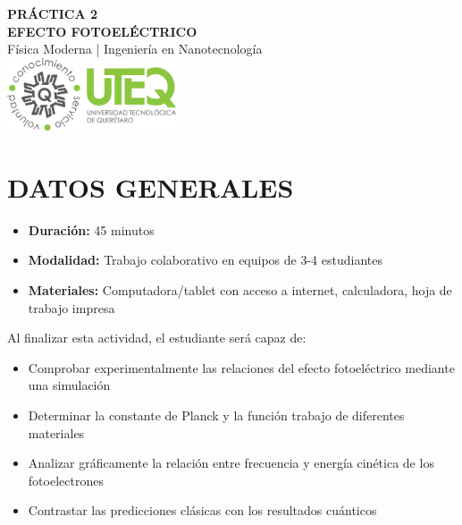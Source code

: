 \documentclass[12pt,a4paper]{article}
\begin{document}
	
	\begin{center}
		{\Huge \textbf{PRÁCTICA 2}}\\[0.3cm]
		{\LARGE \textbf{EFECTO FOTOELÉCTRICO}}\\[0.2cm]
		{\large Física Moderna | Ingeniería en Nanotecnología}\\[1cm]
		\includegraphics[width=5cm]{../../Imagenes/Logo_uteq}
	\end{center}
	
	\vspace{0.5cm}
	
	\section*{DATOS GENERALES}
	\vspace{0.2cm}
	\begin{itemize}
		\item \textbf{Duración:} 45 minutos
		\item \textbf{Modalidad:} Trabajo colaborativo en equipos de 3-4 estudiantes
		\item \textbf{Materiales:} Computadora/tablet con acceso a internet, calculadora, hoja de trabajo impresa
	\end{itemize}

	\vspace{0.5cm}
	
	\begin{objetivobox}
		Al finalizar esta actividad, el estudiante será capaz de:
		\begin{itemize}
			\item Comprobar experimentalmente las relaciones del efecto fotoeléctrico mediante una simulación
			\item Determinar la constante de Planck y la función trabajo de diferentes materiales
			\item Analizar gráficamente la relación entre frecuencia y energía cinética de los fotoelectrones
			\item Contrastar las predicciones clásicas con los resultados cuánticos
		\end{itemize}
	\end{objetivobox}
	
	\vspace{1cm}
\end{document}
